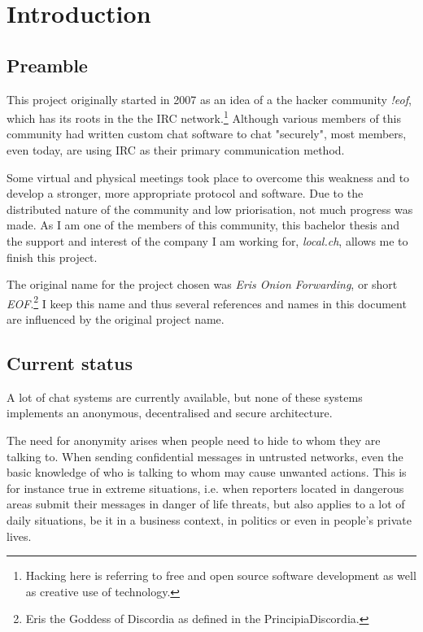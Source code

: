 \chapter{Introduction}
\section{Preamble}
This project originally started in 2007 as an idea of a the hacker
community \textit{!eof}, which has its roots in the the IRC
network.\footnote{Hacking here is referring to free and open source
software development as well as creative use of technology.}
Although various members of this community had written custom chat software
to chat "securely", most members, even today, are using IRC as their
primary communication method.

Some virtual and physical meetings took place to overcome this weakness
and to develop a stronger, more appropriate protocol and software.
Due to the distributed nature of the community and low priorisation, not
much progress was made. As I am one of the members of this community,
this bachelor thesis and the support and interest
of the company I am working for, \textit{local.ch}, allows me to finish
this project.

The original name for the project chosen was \textit{Eris Onion Forwarding}, or
short \textit{EOF}.\footnote{Eris the Goddess of Discordia as defined
in the PrincipiaDiscordia.}
I keep this name and thus several references and names
in this document are influenced by the original project name.
\section{Current status}
A lot of chat systems are currently available, 
but none of these systems implements an anonymous, decentralised and secure architecture.

The need for anonymity arises when people need to hide to whom they are talking to. 
When sending confidential messages 
in untrusted networks, even the basic knowledge of who is talking to whom may 
cause unwanted actions.
This is for instance true in extreme situations, i.e. when reporters located in 
dangerous areas submit their messages in danger of life threats, but also 
applies to a lot of daily situations, be it in a business context,
in politics or even in people's private lives. 

